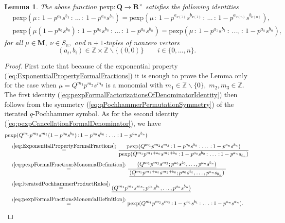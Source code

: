 \documentclass{amsart}
\newtheorem{lemma}[theorem]{Lemma}
\begin{document}
\begin{lemma}
The above function $\mathrm{pexp}:\mathbf Q\rightarrow\mathbf R^\times$ satisfies the following identities
\begin{subequations}
\begin{align}
&\mathrm{pexp}(\mu\,\mathbf{:}\,1-p^{a_1}s^{b_1}\,\mathbf{:}\,\dots\,\mathbf{:}\,1-p^{a_n}s^{b_n})=\mathrm{pexp}(\mu\,\mathbf{:}\,1-p^{a_{\nu(1)}}s^{b_{\nu(1)}}\,\mathbf{:}\,\dots\,\mathbf{:}\,1-p^{a_{\nu(n)}}s^{b_{\nu(n)}}),
\label{eq:pexpFormalFactorizationsOfDenominatorIdentity}\\
&\mathrm{pexp}(\mu (1-p^{a_0}s^{b_0})\,\mathrm{:}\,1-p^{a_0}s^{b_0}\,\mathbf{:}\,\dots\,\mathbf{:}\,1-p^{a_n}s^{b_n})=\mathrm{pexp}(\mu\,\mathbf{:}\,1-p^{a_1}s^{b_1}\,\mathbf{:}\,\dots,\,\mathbf{:}\,1-p^{a_n}s^{b_n}),
\label{eq:pexpCancellationFormalDenominator}
\end{align}
\end{subequations}
for all $\mu\in\mathbf M,\;\nu\in S_n,$ and $n+1$-tuples of nonzero vectors
\begin{equation*}
(a_i,b_i)\in\mathbb Z\times\mathbb Z\backslash\{(0,0)\}\qquad i\in\{0,\dots,n\}.
\end{equation*}
\label{lemm:pexpEquivalenceSingleFactor}
\end{lemma}
\begin{proof}
First note that because of the exponential property (\ref{eq:ExponentialPropertyFormalFractions}) it is enough to prove the Lemma only for the case when $\mu=Q^{m_1}p^{m_2}s^{m_3}$ is a monomial with $m_1\in\mathbb Z\backslash\{0\},\;m_2,m_3\in\mathbb Z$. The first identity (\ref{eq:pexpFormalFactorizationsOfDenominatorIdentity}) then follows from the symmetry (\ref{eq:qPochhammerPermutationSymmetry}) of the iterated $q$-Pochhammer symbol. As for the second identity (\ref{eq:pexpCancellationFormalDenominator}), we have
\begin{align*}
&\mathrm{pexp}(Q^{m_1}p^{m_2}s^{m_3}(1-p^{a_0}s^{b_0})\,\mathbf{:}\,1-p^{a_0}s^{b_0}\,\mathbf{:}\,\dots\,\mathbf{:}\,1-p^{a_n}s^{b_n})\\[0.3em]
&\quad\overset{(\ref{eq:ExponentialPropertyFormalFractions})}{=} \frac{\mathrm{pexp}(Q^{m_1}p^{m_2}s^{m_3}\,\mathbf{:}\,1-p^{a_0}s^{b_0}\,\mathbf{:}\,\dots\,\mathbf{:}\,1-p^{a_n}s^{b_n})}{\mathrm{pexp}(Q^{m_1}p^{m_1+a_0}s^{m_2+b_0}\,\mathbf{:}\,1-p^{a_0}s^{b_0}\,\mathbf{:}\,\dots\,\mathbf{:}\,1-p^{a_n}s_{b_n})}\\[0.3em]
&\quad\overset{(\ref{eq:pexpFormalFractionsMonomialDefinition})}{=} \frac{\underline{(Q^{m_1}p^{m_2}s^{m_3};p^{a_0}s^{b_0},\dots,p^{a_n}s^{b_n})}}{\;\underline{(Q^{m_1}p^{m_1+a_0}s^{m_2+b_0};p^{a_0}s^{b_0},\dots,p^{a_n}s_{b_n}})\;}\\[0.3em]
&\quad\overset{(\ref{eq:IteratedPochhammerProductRules})}{=}\underline{(Q^{m_1}p^{m_2}s^{m_3};p^{a_1}s^{b_1},\dots,p^{a_n}s^{b_n})}\\[0.3em]
&\quad\overset{(\ref{eq:pexpFormalFractionsMonomialDefinition})}{=}\mathrm{pexp}(Q^{m_1}p^{m_2}s^{m_3}\,\mathbf{:}\,1-p^{a_1}s^{b_1}\,\mathbf{:}\,\dots\,\mathbf{:}\,1-p^{a_n}s^{a_n}).
\end{align*}
\end{proof}
\end{document}
